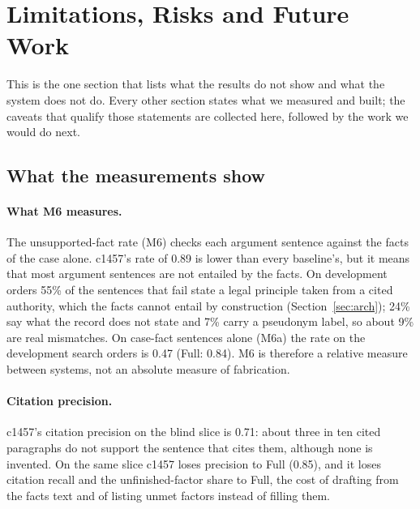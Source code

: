 \section{Limitations, Risks and Future Work}
\label{sec:limitations}

This is the one section that lists what the results do not show and what the system does not do. Every other section states what we measured and built; the caveats that qualify those statements are collected here, followed by the work we would do next.

\subsection{What the measurements show}

\paragraph{What M6 measures.} The unsupported-fact rate (M6) checks each argument sentence against the facts of the case alone. c1457's rate of 0.89 is lower than every baseline's, but it means that most argument sentences are not entailed by the facts. On development orders 55\% of the sentences that fail state a legal principle taken from a cited authority, which the facts cannot entail by construction (Section~\ref{sec:arch}); 24\% say what the record does not state and 7\% carry a pseudonym label, so about 9\% are real mismatches. On case-fact sentences alone (M6a) the rate on the development search orders is 0.47 (Full: 0.84). M6 is therefore a relative measure between systems, not an absolute measure of fabrication.

\paragraph{Citation precision.} c1457's citation precision on the blind slice is 0.71: about three in ten cited paragraphs do not support the sentence that cites them, although none is invented. On the same slice c1457 loses precision to Full (0.85), and it loses citation recall and the unfinished-factor share to Full, the cost of drafting from the facts text and of listing unmet factors instead of filling them.

